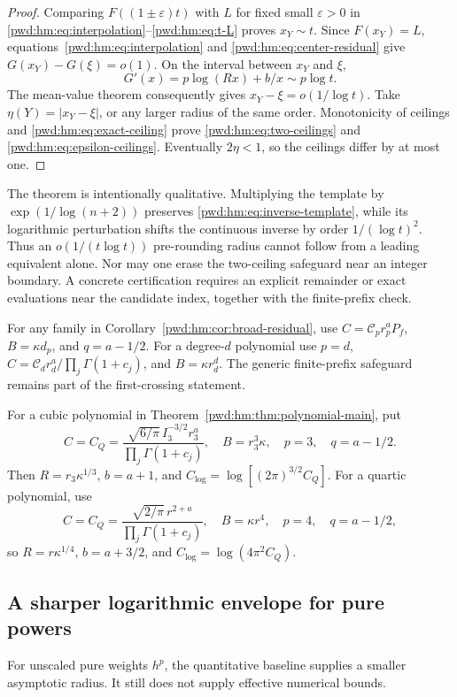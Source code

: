 \documentclass[11pt,letterpaper]{article}
\numberwithin{equation}{section}
\theoremstyle{remark}\newtheorem{remark}[theorem]{Remark}
\begin{document}
\begin{proof}
Comparing $F((1\pm\varepsilon)t)$ with $L$ for fixed small $\varepsilon>0$ in \eqref{pwd:hm:eq:interpolation}--\eqref{pwd:hm:eq:t-L} proves $x_Y\sim t$. Since $F(x_Y)=L$, equations~\eqref{pwd:hm:eq:interpolation} and \eqref{pwd:hm:eq:center-residual} give
$G(x_Y)-G(\xi)=o(1)$. On the interval between $x_Y$ and $\xi$,
\[
 G'(x)=p\log(Rx)+b/x\sim p\log t.
\]
The mean-value theorem consequently gives $x_Y-\xi=o(1/\log t)$. Take
$\eta(Y)=|x_Y-\xi|$, or any larger radius of the same order. Monotonicity of ceilings and \eqref{pwd:hm:eq:exact-ceiling} prove \eqref{pwd:hm:eq:two-ceilings} and \eqref{pwd:hm:eq:epsilon-ceilings}. Eventually $2\eta<1$, so the ceilings differ by at most one.
\end{proof}

The theorem is intentionally qualitative. Multiplying the template by
$\exp(1/\log(n+2))$ preserves \eqref{pwd:hm:eq:inverse-template}, while its logarithmic perturbation shifts the continuous inverse by order $1/(\log t)^2$. Thus an $o(1/(t\log t))$ pre-rounding radius cannot follow from a leading equivalent alone. Nor may one erase the two-ceiling safeguard near an integer boundary. A concrete certification requires an explicit remainder or exact evaluations near the candidate index, together with the finite-prefix check.

For any family in Corollary~\ref{pwd:hm:cor:broad-residual}, use $C=\mathcal{C}_pr_p^aP_f$, $B=\kappa d_p$, and $q=a-1/2$. For a degree-$d$ polynomial use $p=d$, $C=\mathcal{C}_dr_d^a/\prod_j\Gamma(1+c_j)$, and $B=\kappa r_d^d$. The generic finite-prefix safeguard remains part of the first-crossing statement.

For a cubic polynomial in Theorem~\ref{pwd:hm:thm:polynomial-main}, put
\[
 C=C_Q=\frac{\sqrt{6/\pi}\,I_3^{-3/2}r_3^a}{\prod_j\Gamma(1+c_j)},\quad
 B=r_3^3\kappa,\quad p=3,\quad q=a-1/2.
\]
Then $R=r_3\kappa^{1/3}$, $b=a+1$, and
$C_{\log}=\log[(2\pi)^{3/2}C_Q]$. For a quartic polynomial, use
\[
 C=C_Q=\frac{\sqrt{2/\pi}\,r^{2+a}}{\prod_j\Gamma(1+c_j)},\quad
 B=\kappa r^4,\quad p=4,\quad q=a-1/2,
\]
so $R=r\kappa^{1/4}$, $b=a+3/2$, and $C_{\log}=\log(4\pi^2C_Q)$.

\subsection{A sharper logarithmic envelope for pure powers}
For unscaled pure weights $h^p$, the quantitative baseline supplies a smaller asymptotic radius. It still does not supply effective numerical bounds.
\end{document}
